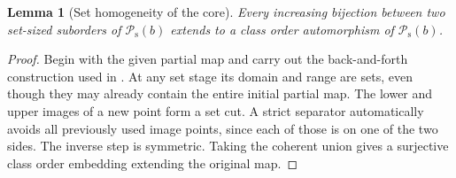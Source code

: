 \documentclass[11pt]{article}
\newtheorem{lemma}[lemma]{Lemma}
\theoremstyle{definition}
\theoremstyle{remark}
\newcommand{\Psupp}{\mathcal P_{\mathrm{s}}}
\begin{document}
\begin{lemma}[Set homogeneity of the core]\label{swo:tc:lem:sethomogeneous}
Every increasing bijection between two set-sized suborders of $\Psupp(b)$
extends to a class order automorphism of $\Psupp(b)$.
\end{lemma}
\begin{proof}
Begin with the given partial map and carry out the back-and-forth
construction used in . At any set stage its
domain and range are sets, even though they may already contain the
entire initial partial map. The lower and upper images of a new point
form a set cut. A strict separator automatically avoids all previously
used image points, since each of those is on one of the two sides.
The inverse step is symmetric. Taking the coherent union gives a
surjective class order embedding extending the original map.
\end{proof}
\end{document}
